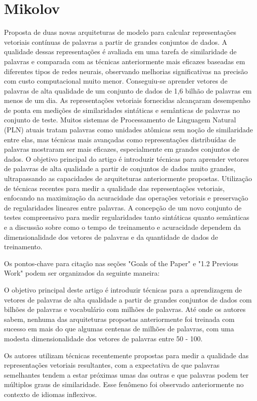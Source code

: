 \section{Mikolov}
Proposta de duas novas arquiteturas de modelo para calcular representações vetoriais contínuas de palavras a partir de grandes conjuntos de dados. A qualidade dessas representações é avaliada em uma tarefa de similaridade de palavras e comparada com as técnicas anteriormente mais eficazes baseadas em diferentes tipos de redes neurais, observando melhorias significativas na precisão com custo computacional muito menor. Conseguiu-se aprender vetores de palavras de alta qualidade de um conjunto de dados de 1,6 bilhão de palavras em menos de um dia. As representações vetoriais fornecidas alcançaram desempenho de ponta em medições de similaridades sintáticas e semânticas de palavras no conjunto de teste. Muitos sistemas de Processamento de Linguagem Natural (PLN) atuais tratam palavras como unidades atômicas sem noção de similaridade entre elas, mas técnicas mais avançadas como representações distribuídas de palavras mostraram ser mais eficazes, especialmente em grandes conjuntos de dados. O objetivo principal do artigo é introduzir técnicas para aprender vetores de palavras de alta qualidade a partir de conjuntos de dados muito grandes, ultrapassando as capacidades de arquiteturas anteriormente propostas. Utilização de técnicas recentes para medir a qualidade das representações vetoriais, enfocando na maximização da acuracidade das operações vetoriais e preservação de regularidades lineares entre palavras. A concepção de um novo conjunto de testes compreensivo para medir regularidades tanto sintáticas quanto semânticas e a discussão sobre como o tempo de treinamento e acuracidade dependem da dimensionalidade dos vetores de palavras e da quantidade de dados de treinamento.

Os pontos-chave para citação nas seções "Goals of the Paper" e "1.2 Previous Work" podem ser organizados da seguinte maneira:

O objetivo principal deste artigo é introduzir técnicas para a aprendizagem de vetores de palavras de alta qualidade a partir de grandes conjuntos de dados com bilhões de palavras e vocabulário com milhões de palavras. Até onde os autores sabem, nenhuma das arquiteturas propostas anteriormente foi treinada com sucesso em mais do que algumas centenas de milhões de palavras, com uma modesta dimensionalidade dos vetores de palavras entre 50 - 100.

Os autores utilizam técnicas recentemente propostas para medir a qualidade das representações vetoriais resultantes, com a expectativa de que palavras semelhantes tendem a estar próximas umas das outras e que palavras podem ter múltiplos graus de similaridade. Esse fenômeno foi observado anteriormente no contexto de idiomas inflexivos.

